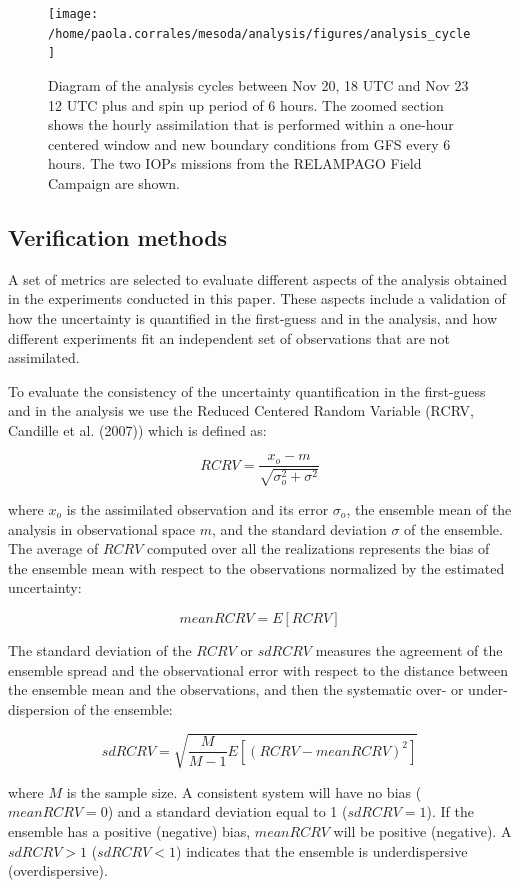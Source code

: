 \documentclass[final,5p,times,twocolumn,authoryear]{elsarticle} %
\begin{document}
\begin{figure}
\texttt{[image: /home/paola.corrales/mesoda/analysis/figures/analysis\_cycle]} \caption{Diagram of the analysis cycles between Nov 20, 18 UTC and Nov 23 12 UTC plus and spin up period of 6 hours. The zoomed section shows the hourly assimilation that is performed within a one-hour centered window and new boundary conditions from GFS every 6 hours. The two IOPs missions from the RELAMPAGO Field Campaign are shown.}\label{fig:cycle}
\end{figure}

\hypertarget{verification-methods}{%
\subsection{Verification methods}\label{verification-methods}}

A set of metrics are selected to evaluate different aspects of the analysis obtained in the experiments conducted in this paper. These aspects include a validation of how the uncertainty is quantified in the first-guess and in the analysis, and how different experiments fit an independent set of observations that are not assimilated.

To evaluate the consistency of the uncertainty quantification in the first-guess and in the analysis we use the Reduced Centered Random Variable (RCRV, Candille et al. (2007)) which is defined as:

\[RCRV = \frac{x_o - m}{\sqrt{\sigma_o^2 + \sigma^2}}\]

where \(x_o\) is the assimilated observation and its error \(\sigma_o\), the ensemble mean of the analysis in observational space \(m\), and the standard deviation \(\sigma\) of the ensemble.
The average of \(RCRV\) computed over all the realizations represents the bias of the ensemble mean with respect to the observations normalized by the estimated uncertainty:

\[\mathit{mean RCRV} = E[RCRV]\]

The standard deviation of the \(RCRV\) or \(sd RCRV\) measures the agreement of the ensemble spread and the observational error with respect to the distance between the ensemble mean and the observations, and then the systematic over- or under- dispersion of the ensemble:

\[\mathit{sd RCRV} = \sqrt{\frac{M}{M -1}E[(\mathit{RCRV} - \mathit{mean RCRV})^2]}\]

where \(M\) is the sample size. A consistent system will have no bias (\(mean RCRV = 0\)) and a standard deviation equal to 1 (\(sd RCRV = 1\)). If the ensemble has a positive (negative) bias, \(mean RCRV\) will be positive (negative). A \(sd RCRV > 1\) (\(sd RCRV < 1\)) indicates that the ensemble is underdispersive (overdispersive).
\end{document}

